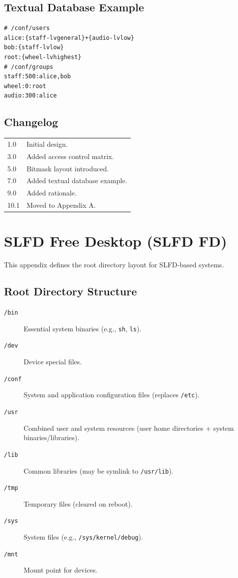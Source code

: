 \documentclass[12pt,a4paper]{article}
\begin{document}
\subsection{Textual Database Example}
\begin{lstlisting}
# /conf/users
alice:{staff-lvgeneral}+{audio-lvlow}
bob:{staff-lvlow}
root:{wheel-lvhighest}
# /conf/groups
staff:500:alice,bob
wheel:0:root
audio:300:alice
\end{lstlisting}

\subsection{Changelog}
\begin{tabularx}{\textwidth}{|l|X|}
\hline
1.0 & Initial design. \\
3.0 & Added access control matrix. \\
5.0 & Bitmask layout introduced. \\
7.0 & Added textual database example. \\
9.0 & Added rationale. \\
10.1 & Moved to Appendix A. \\
\hline
\end{tabularx}

\section{SLFD Free Desktop (SLFD FD)}
\label{app:sfd}

This appendix defines the root directory layout for SLFD‑based systems.

\subsection{Root Directory Structure}
\begin{description}
    \item[\texttt{/bin}] Essential system binaries (e.g., \texttt{sh}, \texttt{ls}).
    \item[\texttt{/dev}] Device special files.
    \item[\texttt{/conf}] System and application configuration files (replaces \texttt{/etc}).
    \item[\texttt{/usr}] Combined user and system resources (user home directories + system binaries/libraries).
    \item[\texttt{/lib}] Common libraries (may be symlink to \texttt{/usr/lib}).
    \item[\texttt{/tmp}] Temporary files (cleared on reboot).
    \item[\texttt{/sys}] System files (e.g., \texttt{/sys/kernel/debug}).
    \item[\texttt{/mnt}] Mount point for devices.
\end{description}
\end{document}
